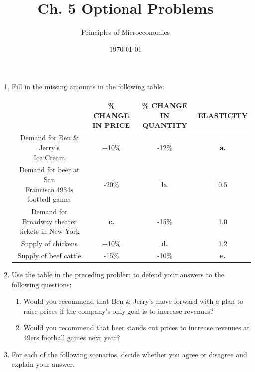 \documentclass{article}
\title{Ch. 5 Optional Problems}
\author{Principles of Microeconomics}
\date{\today}
\begin{document}
\maketitle

\begin{enumerate}

\item Fill in the missing amounts in the following table:

\begin{tabular}{| c | c | c | c |}
\hline
 & \makecell{\% CHANGE\\IN PRICE} & \makecell{\% CHANGE\\IN QUANTITY} & ELASTICITY \\
 \hline
 \makecell{Demand for Ben \& Jerry's\\Ice Cream} & +10\% & -12\% & \textbf{a.} \\
 \hline
 \makecell{Demand for beer at San\\Francisco 4934s football games} & -20\% & \textbf{b.} & 0.5 \\
 \hline
 \makecell{Demand for Broadway theater\\tickets in New York} & \textbf{c.} & -15\% & 1.0 \\
 \hline
 Supply of chickens & +10\% & \textbf{d.} & 1.2 \\
 \hline
 Supply of beef cattle & -15\% & -10\% & \textbf{e.} \\
 \hline
\end{tabular}

\item Use the table in the preceding problem to defend your answers to the following questions:

	\begin{enumerate}
	
	\item Would you recommend that Ben \& Jerry's move forward with a plan to raise prices if the company's only goal is to increase revenues?
	
	\item Would you recommend that beer stands cut prices to increase revenues at 49ers football games next year?
	
	\end{enumerate}

\item For each of the following scenarios, decide whether you agree or disagree and explain your answer.

	\begin{enumerate}
	

\end{enumerate}
\end{enumerate}
\end{document}

